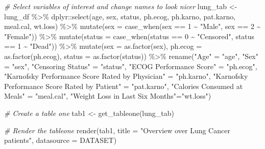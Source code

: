 \documentclass[
]{article}
\newenvironment{Shaded}{\begin{snugshade}}{\end{snugshade}}
\newcommand{\AttributeTok}[1]{\textcolor[rgb]{0.77,0.63,0.00}{#1}}
\newcommand{\CommentTok}[1]{\textcolor[rgb]{0.56,0.35,0.01}{\textit{#1}}}
\newcommand{\DecValTok}[1]{\textcolor[rgb]{0.00,0.00,0.81}{#1}}
\newcommand{\FunctionTok}[1]{\textcolor[rgb]{0.00,0.00,0.00}{#1}}
\newcommand{\NormalTok}[1]{#1}
\newcommand{\OtherTok}[1]{\textcolor[rgb]{0.56,0.35,0.01}{#1}}
\newcommand{\SpecialCharTok}[1]{\textcolor[rgb]{0.00,0.00,0.00}{#1}}
\newcommand{\StringTok}[1]{\textcolor[rgb]{0.31,0.60,0.02}{#1}}
\begin{document}
\begin{Shaded}
\begin{Highlighting}[]
\CommentTok{\# Select variables of interest and change names to look nicer}
\NormalTok{lung\_tab }\OtherTok{\textless{}{-}}\NormalTok{ lung\_df }\SpecialCharTok{\%\textgreater{}\%}  
\NormalTok{  dplyr}\SpecialCharTok{::}\FunctionTok{select}\NormalTok{(age, sex, status, ph.ecog, ph.karno, pat.karno, meal.cal, wt.loss) }\SpecialCharTok{\%\textgreater{}\%}
  \FunctionTok{mutate}\NormalTok{(}\AttributeTok{sex =} \FunctionTok{case\_when}\NormalTok{(sex }\SpecialCharTok{==} \DecValTok{1} \SpecialCharTok{\textasciitilde{}} \StringTok{"Male"}\NormalTok{,}
\NormalTok{                         sex }\SpecialCharTok{==} \DecValTok{2} \SpecialCharTok{\textasciitilde{}} \StringTok{"Female"}\NormalTok{)) }\SpecialCharTok{\%\textgreater{}\%}
  \FunctionTok{mutate}\NormalTok{(}\AttributeTok{status =} \FunctionTok{case\_when}\NormalTok{(status }\SpecialCharTok{==} \DecValTok{0} \SpecialCharTok{\textasciitilde{}} \StringTok{"Censored"}\NormalTok{,}
\NormalTok{                            status }\SpecialCharTok{==} \DecValTok{1} \SpecialCharTok{\textasciitilde{}} \StringTok{"Dead"}\NormalTok{)) }\SpecialCharTok{\%\textgreater{}\%}
  \FunctionTok{mutate}\NormalTok{(}\AttributeTok{sex =} \FunctionTok{as.factor}\NormalTok{(sex),}
         \AttributeTok{ph.ecog =} \FunctionTok{as.factor}\NormalTok{(ph.ecog), }
         \AttributeTok{status =} \FunctionTok{as.factor}\NormalTok{(status)) }\SpecialCharTok{\%\textgreater{}\%}
  \FunctionTok{rename}\NormalTok{(}\StringTok{"Age"} \OtherTok{=} \StringTok{"age"}\NormalTok{, }
         \StringTok{"Sex"} \OtherTok{=} \StringTok{"sex"}\NormalTok{, }
         \StringTok{"Censoring Status"} \OtherTok{=} \StringTok{"status"}\NormalTok{, }
         \StringTok{"ECOG Performance Score"} \OtherTok{=} \StringTok{"ph.ecog"}\NormalTok{, }
         \StringTok{"Karnofsky Performance Score Rated by Physician"} \OtherTok{=} \StringTok{"ph.karno"}\NormalTok{, }
         \StringTok{"Karnofsky Performance Score Rated by Patient"} \OtherTok{=} \StringTok{"pat.karno"}\NormalTok{, }
         \StringTok{"Calories Consumed at Meals"} \OtherTok{=} \StringTok{"meal.cal"}\NormalTok{, }
         \StringTok{"Weight Loss in Last Six Months"}\OtherTok{=}\StringTok{"wt.loss"}\NormalTok{) }

\CommentTok{\# Create a table one}
\NormalTok{tab1 }\OtherTok{\textless{}{-}} \FunctionTok{get\_tableone}\NormalTok{(lung\_tab)}

\CommentTok{\# Render the tableone}
\FunctionTok{render}\NormalTok{(tab1, }\AttributeTok{title =} \StringTok{"Overview over Lung Cancer patients"}\NormalTok{, }\AttributeTok{datasource =}\NormalTok{ DATASET)}
\end{Highlighting}
\end{Shaded}
\end{document}
